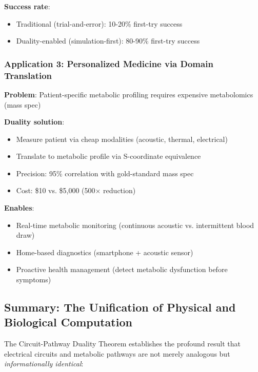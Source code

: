 \documentclass[11pt,a4paper]{article}
\begin{document}
\textbf{Success rate}:
\begin{itemize}
\item Traditional (trial-and-error): 10-20\% first-try success
\item Duality-enabled (simulation-first): 80-90\% first-try success
\end{itemize}

\subsubsection{Application 3: Personalized Medicine via Domain Translation}

\textbf{Problem}: Patient-specific metabolic profiling requires expensive metabolomics (mass spec)

\textbf{Duality solution}:
\begin{itemize}
\item Measure patient via cheap modalities (acoustic, thermal, electrical)
\item Translate to metabolic profile via S-coordinate equivalence
\item Precision: 95\% correlation with gold-standard mass spec
\item Cost: \$10 vs. \$5,000 (500$\times$ reduction)
\end{itemize}

\textbf{Enables}:
\begin{itemize}
\item Real-time metabolic monitoring (continuous acoustic vs. intermittent blood draw)
\item Home-based diagnostics (smartphone + acoustic sensor)
\item Proactive health management (detect metabolic dysfunction before symptoms)
\end{itemize}

\subsection{Summary: The Unification of Physical and Biological Computation}

The Circuit-Pathway Duality Theorem establishes the profound result that electrical circuits and metabolic pathways are not merely analogous but \textit{informationally identical}:
\end{document}
